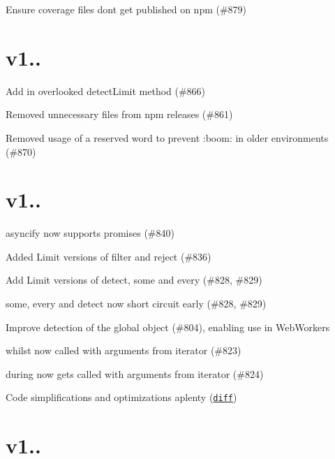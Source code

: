 
\begin{DoxyItemize}
\item Ensure coverage files don\textquotesingle{}t get published on npm (\#879)
\end{DoxyItemize}

\section*{v1..}


\begin{DoxyItemize}
\item Add in overlooked {\ttfamily detect\+Limit} method (\#866)
\item Removed unnecessary files from npm releases (\#861)
\item Removed usage of a reserved word to prevent \+:boom\+: in older environments (\#870)
\end{DoxyItemize}

\section*{v1..}


\begin{DoxyItemize}
\item {\ttfamily asyncify} now supports promises (\#840)
\item Added {\ttfamily Limit} versions of {\ttfamily filter} and {\ttfamily reject} (\#836)
\item Add {\ttfamily Limit} versions of {\ttfamily detect}, {\ttfamily some} and {\ttfamily every} (\#828, \#829)
\item {\ttfamily some}, {\ttfamily every} and {\ttfamily detect} now short circuit early (\#828, \#829)
\item Improve detection of the global object (\#804), enabling use in Web\+Workers
\item {\ttfamily whilst} now called with arguments from iterator (\#823)
\item {\ttfamily during} now gets called with arguments from iterator (\#824)
\item Code simplifications and optimizations aplenty (\href{https://github.com/caolan/async/compare/v1.3.0...v1.4.0}{\tt diff})
\end{DoxyItemize}

\section*{v1..}

